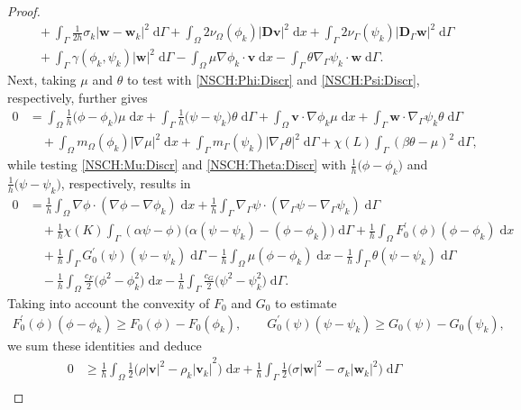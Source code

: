 \documentclass[11pt,reqno]{amsart}
\theoremstyle{remark}
\numberwithin{equation}{section}
\newcommand{\abs}[1]{|#1|}
\newcommand{\intO}{\int_\Omega}
\newcommand{\intG}{\int_\Gamma}
\newcommand{\dx}{\;\mathrm{d}x}
\newcommand{\dG}{\;\mathrm d\Ga}
\newcommand{\Grad}{\nabla}
\newcommand{\Gradg}{\nabla_\Ga}
\newcommand{\Om}{\Omega}
\newcommand{\Ga}{\Gamma}
\newcommand{\bv}{\mathbf v}
\newcommand{\bw}{\mathbf w}
\newcommand{\D}{\mathbf D}
\newcommand{\Dg}{\mathbf D_\Ga}
\begin{document}
\begin{proof}
\begin{align*}
        &\quad + \intG \frac{1}{2h}\sigma_k\abs{\bw - \bw_k}^2\dG + \intO 2\nu_\Om(\phi_k)\abs{\D\bv}^2\dx + \intG 2\nu_\Ga(\psi_k)\abs{\Dg\bw}^2\dG \\
        &\quad + \intG \gamma(\phi_k,\psi_k)\abs{\bw}^2\dG - \intO \mu\Grad\phi_k\cdot\bv \dx - \intG \theta\Gradg\psi_k\cdot\bw \dG. \nonumber
    \end{align*}
    Next, taking $\mu$ and $\theta$ to test with \eqref{NSCH:Phi:Discr} and \eqref{NSCH:Psi:Discr}, respectively, further gives
    \begin{align*}
        0 &= \intO \frac{1}{h}\big(\phi - \phi_k\big)\mu\dx + \intG \frac{1}{h}\big(\psi - \psi_k\big)\theta\dG + \intO \bv\cdot\Grad\phi_k\mu\dx + \intG \bw\cdot\Gradg\psi_k\theta\dG \nonumber \\
        &\quad + \intO m_\Om(\phi_k)\abs{\Grad\mu}^2\dx + \intG m_\Ga(\psi_k)\abs{\Gradg\theta}^2 \dG + \chi(L)\intG (\beta\theta - \mu)^2\dG,
    \end{align*}
    while testing \eqref{NSCH:Mu:Discr} and \eqref{NSCH:Theta:Discr} with $\frac1h\big(\phi - \phi_k\big)$ and $\frac1h\big(\psi - \psi_k\big)$, respectively, results in
    \begin{align*}
        0 &= \frac1h\intO\Grad\phi\cdot(\Grad\phi - \Grad\phi_k)\dx + \frac1h\intG\Gradg\psi\cdot(\Gradg\psi - \Gradg\psi_k)\dG \nonumber \\
        &\quad + \frac1h\chi(K)\intG (\alpha\psi - \phi)\big(\alpha(\psi - \psi_k) - (\phi - \phi_k)\big)\dG + \frac1h\intO F_0^\prime(\phi)(\phi - \phi_k)\dx \nonumber \\
        &\quad + \frac1h\intG G_0^\prime(\psi)(\psi - \psi_k)\dG - \frac1h \intO \mu(\phi - \phi_k)\dx - \frac1h\intG \theta(\psi - \psi_k)\dG \\
        &\quad - \frac1h\intO\frac{c_F}{2}\big(\phi^2 - \phi_k^2\big)\dx - \frac1h\intG \frac{c_G}{2}\big(\psi^2 - \psi_k^2\big)\dG. \nonumber 
    \end{align*}
    Taking into account the convexity of $F_0$ and $G_0$ to estimate
    \begin{align*}
        F_0^\prime(\phi)(\phi - \phi_k) \geq F_0(\phi) - F_0(\phi_k), \qquad G_0^\prime(\psi)(\psi - \psi_k) \geq G_0(\psi) - G_0(\psi_k),
    \end{align*}
    we sum these identities and deduce
    \begin{align*}
        0 &\geq \frac1h\intO \frac12\Big(\rho{\abs{\bv}^2 - \rho_k\abs{\bv_k}}^2\Big)\dx + \frac1h\intG \frac12\Big(\sigma\abs{\bw}^2 - \sigma_k\abs{\bw_k}^2\Big)\dG \nonumber \\

\end{align*}
\end{proof}
\end{document}
